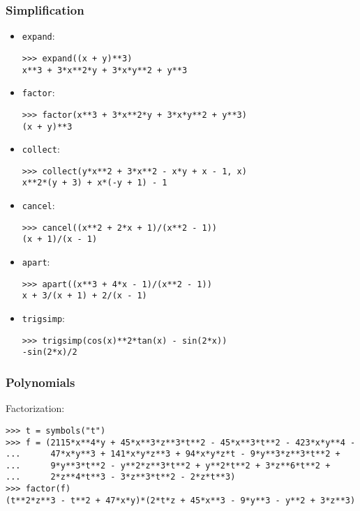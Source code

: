 
\subsubsection{Simplification}
\begin{itemize}
\item \texttt{expand}:
\begin{verbatim}
>>> expand((x + y)**3)
x**3 + 3*x**2*y + 3*x*y**2 + y**3
\end{verbatim}

\item \texttt{factor}:
\begin{verbatim}
>>> factor(x**3 + 3*x**2*y + 3*x*y**2 + y**3)
(x + y)**3
\end{verbatim}

\item \texttt{collect}:
\begin{verbatim}
>>> collect(y*x**2 + 3*x**2 - x*y + x - 1, x)
x**2*(y + 3) + x*(-y + 1) - 1
\end{verbatim}

\item \texttt{cancel}:
\begin{verbatim}
>>> cancel((x**2 + 2*x + 1)/(x**2 - 1))
(x + 1)/(x - 1)
\end{verbatim}

\item \texttt{apart}:
\begin{verbatim}
>>> apart((x**3 + 4*x - 1)/(x**2 - 1))
x + 3/(x + 1) + 2/(x - 1)
\end{verbatim}

\item \texttt{trigsimp}:
\begin{verbatim}
>>> trigsimp(cos(x)**2*tan(x) - sin(2*x))
-sin(2*x)/2
\end{verbatim}
\end{itemize}

\subsubsection{Polynomials}
\noindent Factorization:
\begin{verbatim}
>>> t = symbols("t")
>>> f = (2115*x**4*y + 45*x**3*z**3*t**2 - 45*x**3*t**2 - 423*x*y**4 -
...      47*x*y**3 + 141*x*y*z**3 + 94*x*y*z*t - 9*y**3*z**3*t**2 +
...      9*y**3*t**2 - y**2*z**3*t**2 + y**2*t**2 + 3*z**6*t**2 +
...      2*z**4*t**3 - 3*z**3*t**2 - 2*z*t**3)
>>> factor(f)
(t**2*z**3 - t**2 + 47*x*y)*(2*t*z + 45*x**3 - 9*y**3 - y**2 + 3*z**3)
\end{verbatim}

